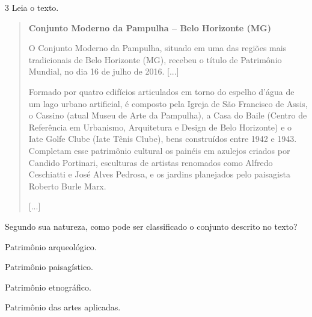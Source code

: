 \num{3} Leia o texto.

\begin{quote}
\textbf{Conjunto Moderno da Pampulha -- Belo Horizonte (MG)}

O Conjunto Moderno da Pampulha, situado em uma das regiões mais
tradicionais de Belo Horizonte (MG), recebeu o título de Patrimônio
Mundial, no dia 16 de julho de 2016. {[}...{]}

Formado por quatro edifícios articulados em torno do espelho d'água de
um lago urbano artificial, é composto pela Igreja de São Francisco de
Assis, o Cassino (atual Museu de Arte da Pampulha), a Casa do Baile
(Centro de Referência em Urbanismo, Arquitetura e Design de Belo
Horizonte) e o Iate Golfe Clube (Iate Tênis Clube), bens construídos
entre 1942 e 1943. Completam esse patrimônio cultural os painéis em
azulejos criados por Candido Portinari, esculturas de artistas renomados
como Alfredo Ceschiatti e José Alves Pedrosa, e os jardins planejados
pelo paisagista Roberto Burle Marx.

{[}...{]}

\end{quote}

Segundo sua natureza, como pode ser classificado o conjunto descrito no texto?

\begin{escolha}
\item
  Patrimônio arqueológico.
\item
  Patrimônio paisagístico.
\item
  Patrimônio etnográfico.
\item
  Patrimônio das artes aplicadas.
\end{escolha}






